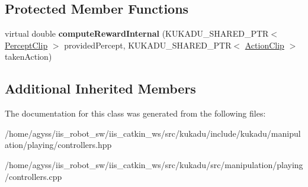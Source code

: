 \subsection*{Protected Member Functions}
\begin{DoxyCompactItemize}
\item 
virtual double {\bfseries compute\+Reward\+Internal} (K\+U\+K\+A\+D\+U\+\_\+\+S\+H\+A\+R\+E\+D\+\_\+\+P\+TR$<$ \hyperlink{classkukadu_1_1PerceptClip}{Percept\+Clip} $>$ provided\+Percept, K\+U\+K\+A\+D\+U\+\_\+\+S\+H\+A\+R\+E\+D\+\_\+\+P\+TR$<$ \hyperlink{classkukadu_1_1ActionClip}{Action\+Clip} $>$ taken\+Action)\hypertarget{classkukadu_1_1EnvironmentReward_acf8690283667b4f799edbf2c9ec3b2a9}{}\label{classkukadu_1_1EnvironmentReward_acf8690283667b4f799edbf2c9ec3b2a9}

\end{DoxyCompactItemize}
\subsection*{Additional Inherited Members}


The documentation for this class was generated from the following files\+:\begin{DoxyCompactItemize}
\item 
/home/agyss/iis\+\_\+robot\+\_\+sw/iis\+\_\+catkin\+\_\+ws/src/kukadu/include/kukadu/manipulation/playing/controllers.\+hpp\item 
/home/agyss/iis\+\_\+robot\+\_\+sw/iis\+\_\+catkin\+\_\+ws/src/kukadu/src/manipulation/playing/controllers.\+cpp\end{DoxyCompactItemize}
